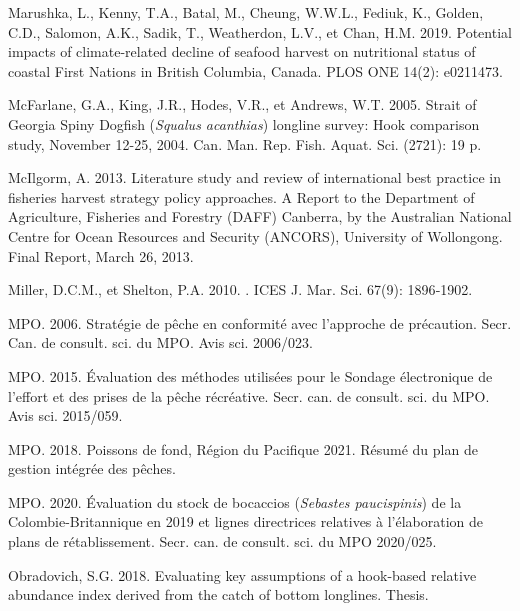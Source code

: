 \documentclass[french,11pt]{book}
\begin{document}
\begin{CSLReferences}{1}{0}
%
Marushka, L., Kenny, T.A., Batal, M., Cheung, W.W.L., Fediuk, K., Golden, C.D., Salomon, A.K., Sadik, T., Weatherdon, L.V., et Chan, H.M. 2019. Potential impacts of climate-related decline of seafood harvest on nutritional status of coastal {First Nations} in {British Columbia, Canada}. PLOS ONE 14(2): e0211473.

%
McFarlane, G.A., King, J.R., Hodes, V.R., et Andrews, W.T. 2005. {Strait} of {Georgia Spiny Dogfish} ({\emph{Squalus acanthias}}) longline survey: Hook comparison study, {November} 12-25, 2004. Can. Man. Rep. Fish. Aquat. Sci. (2721): 19 p.

%
McIlgorm, A. 2013. Literature study and review of international best practice in fisheries harvest strategy policy approaches. {A} Report to the {Department of Agriculture, Fisheries and Forestry (DAFF) Canberra, by the Australian National Centre for Ocean Resources and Security (ANCORS), University of Wollongong. Final Report, March 26, 2013}.

%
Miller, D.C.M., et Shelton, P.A. 2010. . ICES J. Mar. Sci. 67(9): 1896‑1902.

%
MPO. 2006. Stratégie de pêche en conformité avec l'approche de précaution. Secr. Can. de consult. sci. du MPO. Avis sci. 2006/023.

%
MPO. 2015. Évaluation des méthodes utilisées pour le Sondage électronique de l'effort et des prises de la pêche récréative. Secr. can. de consult. sci. du MPO. Avis sci. 2015/059.

%
MPO. 2018. {Poissons de fond, Région du Pacifique 2021. Résumé du plan de gestion intégrée des pêches}.

%
MPO. 2020. Évaluation du stock de bocaccios ({\emph{Sebastes paucispinis}}) de la {Colombie-Britannique} en 2019 et lignes directrices relatives à l'élaboration de plans de rétablissement. Secr. can. de consult. sci. du MPO 2020/025.

%
Obradovich, S.G. 2018. Evaluating key assumptions of a hook-based relative abundance index derived from the catch of bottom longlines. Thesis.


\end{CSLReferences}
\end{document}

